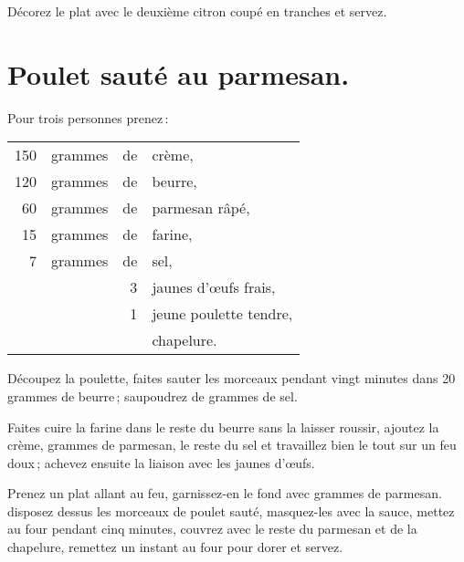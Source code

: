 Décorez le plat avec le deuxième citron coupé en tranches et servez.

\section*{\centering Poulet sauté au parmesan.}
{}

Pour trois personnes prenez :

\medskip

\footnotesize
\begin{longtable}{rrrp{16em}}
    150 & grammes & de & crème,                                                                           \\
    120 & grammes & de & beurre,                                                                          \\
     60 & grammes & de & parmesan râpé,                                                                   \\
     15 & grammes & de & farine,                                                                          \\
      7 & grammes & de & sel,                                                                             \\
        &         &  3 & jaunes d'œufs frais,                                                             \\
        &         &  1 & jeune poulette tendre,                                                           \\
        &         &    & chapelure.                                                                       \\
\end{longtable}
\normalsize

Découpez la poulette, faites sauter les morceaux pendant vingt minutes dans 20
grammes de beurre ; saupoudrez de {\mmm} grammes de sel.

Faites cuire la farine dans le reste du beurre sans la laisser roussir, ajoutez
la crème, {\mmm} grammes de parmesan, le reste du sel et travaillez bien le tout sur
un feu doux ; achevez ensuite la liaison avec les jaunes d'œufs.

Prenez un plat allant au feu, garnissez-en le fond avec {\mmm} grammes de parmesan.
disposez dessus les morceaux de poulet sauté, masquez-les avec la sauce, mettez
au four pendant cinq minutes, couvrez avec le reste du parmesan et de la
chapelure, remettez un instant au four pour dorer et servez.

